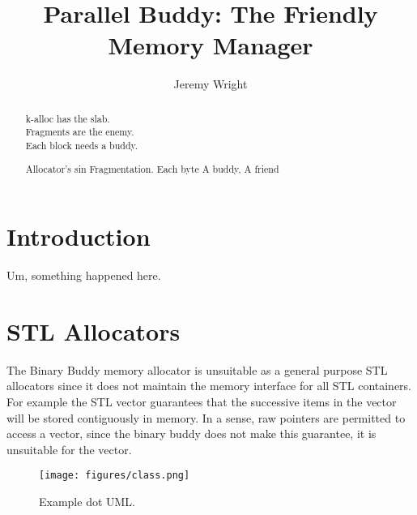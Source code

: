 \documentclass[10pt]{article}
\title{Parallel Buddy: The Friendly Memory Manager}
\author{Jeremy Wright}
\begin{document}
\maketitle

\begin{abstract}
k-alloc has the slab.\\
Fragments are the enemy.\\
Each block needs a buddy.

Allocator's sin
Fragmentation. Each byte
A buddy, A friend
 

\end{abstract}

\section{Introduction}
Um, something happened here.


\section{STL Allocators}
The Binary Buddy memory allocator is unsuitable as a general purpose STL
allocators since it does not maintain the memory interface for all STL
containers. For example the STL vector guarantees that the successive items in
the vector will be stored contiguously in memory. In a sense, raw pointers are
permitted to access a vector, since the binary buddy does not make this
guarantee, it is unsuitable for the vector.


\begin{figure*}[h]
\texttt{[image: figures/class.png]}
\caption{Example dot UML.}
\label{fig:example_uml}
\end{figure*}
\end{document}
